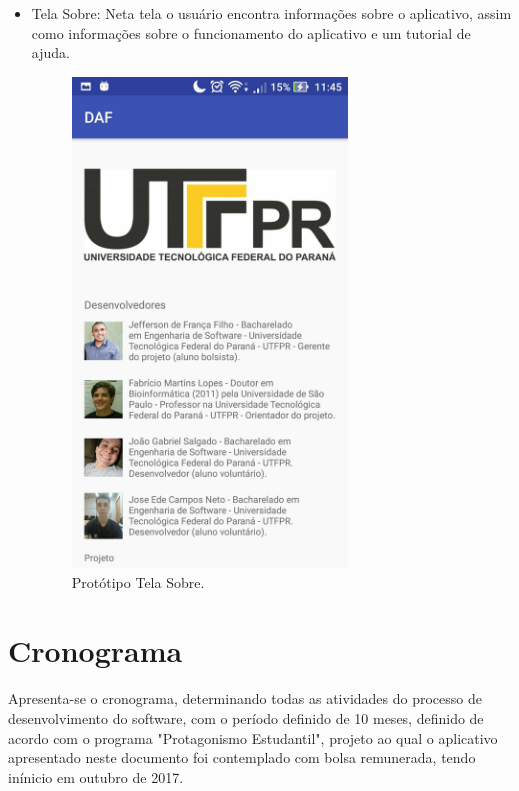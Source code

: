 \begin{itemize}
	\item  Tela Sobre: Neta tela o usu\'ario encontra informa\c{c}\~oes sobre o aplicativo, assim como informa\c{c}\~oes sobre o funcionamento do aplicativo e um tutorial de ajuda. 
	\begin{figure}[H]
		\centering
		\caption[Prot\'otipo Tela Sobre]{Prot\'otipo Tela Sobre. \label{fig:prototiposobre}}
		\includegraphics[height=13cm]{./Figuras/prototipo_sobre.jpg}%
	\end{figure}
\end{itemize}

\section{Cronograma}

Apresenta-se o cronograma, determinando todas as atividades do processo de desenvolvimento do software, com o per\'iodo definido de 10 meses, definido de acordo com o programa "Protagonismo Estudantil", projeto ao qual o aplicativo apresentado neste documento foi contemplado com bolsa remunerada, tendo in\'inicio em outubro de 2017. 

